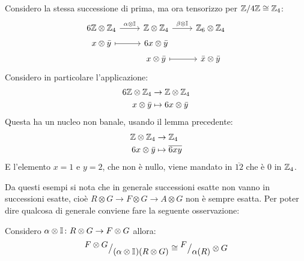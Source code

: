 \begin{example}
  Considero la stessa successione di prima, ma ora tensorizzo per $ {\mathbb{Z}} \slash {4 \mathbb{Z}}  \cong \mathbb{Z}_4 $:
  \[
    \begin{tikzcd}[nodes = {row sep = 3pt}]
       6 \Z \otimes \Z_4 \rar{\alpha \otimes \Id{}} & \Z \otimes \Z_4 \rar{\beta \otimes \Id{}} & \Z_6 \otimes \Z_4  \\
       x \otimes \bar{y} \rar[mapsto] & 6x \otimes \bar{y} & {}\\
       {} & x \otimes \bar{y} \rar[mapsto] & \bar{x} \otimes \bar{y}
    \end{tikzcd}
  \]
  Considero in particolare l'applicazione:
  \begin{align*}
    6 \mathbb{Z} \otimes \mathbb{Z}_4 & \to \mathbb{Z} \otimes \mathbb{Z}_4 \\
     x \otimes \bar{y} & \mapsto 6x \otimes \bar{y}
  \end{align*}
  Questa ha un nucleo non banale, usando il lemma
  precedente:
  \begin{align*}
    \mathbb{Z} \otimes \mathbb{Z}_4 & \to \mathbb{Z}_4 \\
     6x \otimes \bar{y} & \mapsto \overline{6xy}
  \end{align*}
  E l'elemento $ x = 1 $ e $ y = 2 $, che non è nullo, viene mandato in
  $ \overline{12} $ che è $ 0 $ in $ \mathbb{Z}_4 $.

\end{example}
Da questi esempi si nota che in generale successioni esatte non vanno in successioni esatte,
cioè $ R \otimes G \to F \otimes G \to A \otimes G $ non è sempre esatta. Per poter dire qualcosa di generale conviene
fare la seguente osservazione:
\begin{osservation}
Considero $ \alpha \otimes \mathbb{I}_{} \colon R \otimes G \to F \otimes G $ allora:
\[
  {^{\textstyle F \otimes G}\big/_{\textstyle (\alpha \otimes \mathbb{I}_{})(R \otimes G)}} \cong {^{\textstyle F}\big/_{\textstyle \alpha(R)}} \otimes G
\]
\end{osservation}

